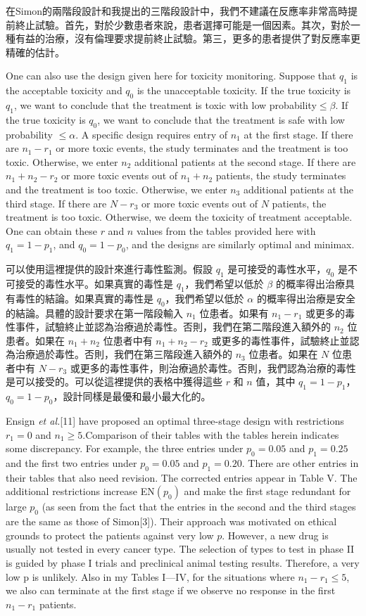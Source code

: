 在Simon的兩階段設計和我提出的三階段設計中，我們不建議在反應率非常高時提前終止試驗。首先，對於少數患者來說，患者選擇可能是一個因素。其次，對於一種有益的治療，沒有倫理要求提前終止試驗。第三，更多的患者提供了對反應率更精確的估計。

One can also use the design given here for toxicity monitoring. Suppose that $q_1$ is the acceptable toxicity and $q_0$ is the unacceptable toxicity. If the true toxicity is $q_1$, we want to conclude that the treatment is toxic with low probability$\leq \beta$. If the true toxicity is $q_0$, we want to conclude that the treatment is safe with low probability $\leq \alpha$. A specific design requires entry of $n_1$ at the first stage. If there are $n_1-r_1$ or more toxic events, the study terminates and the treatment is too toxic. Otherwise, we enter $n_2$ additional patients at the second stage. If there are $n_1+n_2-r_2$ or more toxic events out of $n_1+n_2$ patients, the study terminates and the treatment is too toxic. Otherwise, we enter $n_3$ additional patients at the third stage. If there are $N-r_3$ or more toxic events out of $N$ patients, the treatment is too toxic. Otherwise, we deem the toxicity of treatment acceptable. One can obtain these $r$ and $n$ values from the tables provided here with $q_1=1-p_1$, and $q_0=1-p_0$, and the designs are similarly optimal and minimax.

可以使用這裡提供的設計來進行毒性監測。假設 $q_1$ 是可接受的毒性水平，$q_0$ 是不可接受的毒性水平。如果真實的毒性是 $q_1$，我們希望以低於 $\beta$ 的概率得出治療具有毒性的結論。如果真實的毒性是 $q_0$，我們希望以低於 $\alpha$ 的概率得出治療是安全的結論。具體的設計要求在第一階段輸入 $n_1$ 位患者。如果有 $n_1 - r_1$ 或更多的毒性事件，試驗終止並認為治療過於毒性。否則，我們在第二階段進入額外的 $n_2$ 位患者。如果在 $n_1 + n_2$ 位患者中有 $n_1 + n_2 - r_2$ 或更多的毒性事件，試驗終止並認為治療過於毒性。否則，我們在第三階段進入額外的 $n_3$ 位患者。如果在 $N$ 位患者中有 $N - r_3$ 或更多的毒性事件，則治療過於毒性。否則，我們認為治療的毒性是可以接受的。可以從這裡提供的表格中獲得這些 $r$ 和 $n$ 值，其中 $q_1 = 1 - p_1$，$q_0 = 1 - p_0$，設計同樣是最優和最小最大化的。

Ensign \textit{et al.}[11] have proposed an optimal three-stage design with restrictions $r_1=0$ and $n_1 \geq 5$.Comparison of their tables with the tables herein indicates some discrepancy. For example, the three entries under $p_0=0.05$ and $p_1=0.25$ and the first two entries under $p_0=0.05$ and $p_1=0.20$. There are other entries in their tables that also need revision. The corrected entries appear in Table V. The additional restrictions increase EN$(p_0)$ and make the first stage redundant for large $p_0$ (as seen from the fact that the entries in the second and the third stages are the same as those of Simon[3]). Their approach was motivated on ethical grounds to protect the patients against very low $p$. However, a new drug is usually not tested in every cancer type. The selection of types to test in phase II is guided by phase I trials and preclinical animal testing results. Therefore, a very low p is unlikely. Also in my Tables I—IV, for the situations where $n_1-r_1 \leq 5$, we also can terminate at the first stage if we observe no response in the first $n_1-r_1$ patients.

